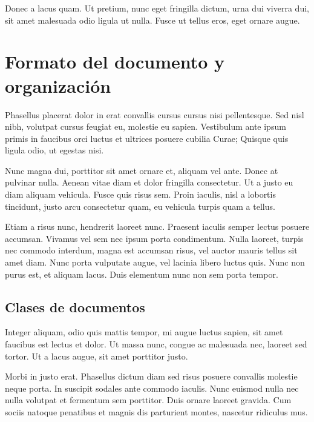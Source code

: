 \documentclass[12pt,a4paper]{report}
\begin{document}
Donec a lacus quam. Ut pretium, nunc eget fringilla dictum, urna dui viverra dui, sit amet malesuada odio ligula ut nulla. Fusce ut tellus eros, eget ornare augue.






\chapter{Formato del documento y organización}\label{tema.formato}





Phasellus placerat dolor in erat convallis cursus cursus nisi pellentesque. Sed nisl nibh, volutpat cursus feugiat eu, molestie eu sapien. Vestibulum ante ipsum primis in faucibus orci luctus et ultrices posuere cubilia Curae; Quisque quis ligula odio, ut egestas nisi. 

Nunc magna dui, porttitor sit amet ornare et, aliquam vel ante. Donec at pulvinar nulla. Aenean vitae diam et dolor fringilla consectetur. Ut a justo eu diam aliquam vehicula. Fusce quis risus sem. Proin iaculis, nisl a lobortis tincidunt, justo arcu consectetur quam, eu vehicula turpis quam a tellus.

Etiam a risus nunc, hendrerit laoreet nunc. Praesent iaculis semper lectus posuere accumsan. Vivamus vel sem nec ipsum porta condimentum. Nulla laoreet, turpis nec commodo interdum, magna est accumsan risus, vel auctor mauris tellus sit amet diam. Nunc porta vulputate augue, vel lacinia libero luctus quis. Nunc non purus est, et aliquam lacus. Duis elementum nunc non sem porta tempor.



\section{Clases de documentos}
\label{seccion.clases}



Integer aliquam, odio quis mattis tempor, mi augue luctus sapien, sit amet faucibus est lectus et dolor. Ut massa nunc, congue ac malesuada nec, laoreet sed tortor. Ut a lacus augue, sit amet porttitor justo. 

Morbi in justo erat. Phasellus dictum diam sed risus posuere convallis molestie neque porta. In suscipit sodales ante commodo iaculis. Nunc euismod nulla nec nulla volutpat et fermentum sem porttitor. Duis ornare laoreet gravida. Cum sociis natoque penatibus et magnis dis parturient montes, nascetur ridiculus mus. 
\end{document}
